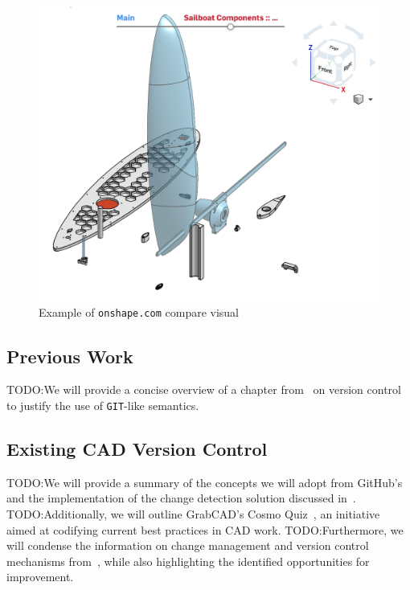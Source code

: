 \documentclass[sigconf,authorversion,nonacm]{acmart}
\begin{document}
\begin{figure}[t]
	\includegraphics[width=\linewidth]{onshapescreenshot.png}
	\caption{Example of \texttt{onshape.com} compare visual}
	\label{fig:onshapescreenshot}
\end{figure}

\subsection{Previous Work}

TODO:We will provide a concise overview of a chapter from~\cite{Frazelle_2021} on version control to justify the use of \texttt{GIT}-like semantics.

\subsection{Existing CAD Version Control}

TODO:We will provide a summary of the concepts we will adopt from GitHub's~\citet{github_blog_2013} and the implementation of the change detection solution discussed in~\citet{3drepo_blog}.
TODO:Additionally, we will outline GrabCAD's Cosmo Quiz~\citet{revisions_2014}, an initiative aimed at codifying current best practices in CAD work.
TODO:Furthermore, we will condense the information on change management and version control mechanisms from~\citet{Bricogne_Rivest_Troussier_Eynard_2012}, while also highlighting the identified opportunities for improvement.
\end{document}
